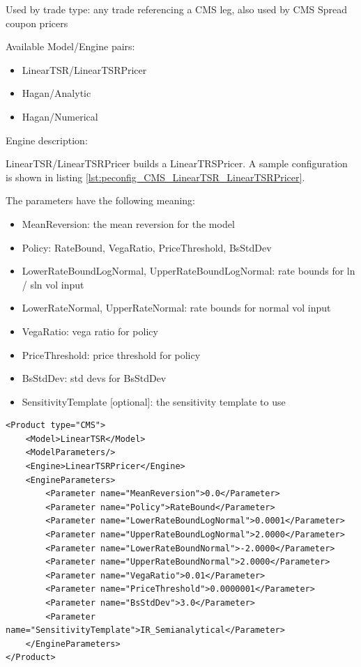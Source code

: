 Used by trade type: any trade referencing a CMS leg, also used by CMS Spread coupon pricers

Available Model/Engine pairs:

\begin{itemize}
  \item LinearTSR/LinearTSRPricer
  \item Hagan/Analytic
  \item Hagan/Numerical
\end{itemize}

Engine description:

LinearTSR/LinearTSRPricer builds a LinearTRSPricer. A sample configuration is shown in listing
\ref{lst:peconfig_CMS_LinearTSR_LinearTSRPricer}.

The parameters have the following meaning:

\begin{itemize}
\item MeanReversion: the mean reversion for the model
\item Policy: RateBound, VegaRatio, PriceThreshold, BsStdDev
\item LowerRateBoundLogNormal, UpperRateBoundLogNormal: rate bounds for ln / sln vol input
\item LowerRateNormal, UpperRateNormal: rate bounds for normal vol input
\item VegaRatio: vega ratio for policy
\item PriceThreshold: price threshold for policy
\item BsStdDev: std devs for BsStdDev
\item SensitivityTemplate [optional]: the sensitivity template to use
\end{itemize}

\begin{longlisting}
\begin{verbatim}
<Product type="CMS">
    <Model>LinearTSR</Model>
    <ModelParameters/>
    <Engine>LinearTSRPricer</Engine>
    <EngineParameters>
        <Parameter name="MeanReversion">0.0</Parameter>
        <Parameter name="Policy">RateBound</Parameter>
        <Parameter name="LowerRateBoundLogNormal">0.0001</Parameter>
        <Parameter name="UpperRateBoundLogNormal">2.0000</Parameter>
        <Parameter name="LowerRateBoundNormal">-2.0000</Parameter>
        <Parameter name="UpperRateBoundNormal">2.0000</Parameter>
        <Parameter name="VegaRatio">0.01</Parameter>
        <Parameter name="PriceThreshold">0.0000001</Parameter>
        <Parameter name="BsStdDev">3.0</Parameter>
        <Parameter name="SensitivityTemplate">IR_Semianalytical</Parameter>
    </EngineParameters>
</Product>
\end{verbatim}
\caption{Configuration for Product CMS, Model LinearTSR, Engine LinearTSRPricer}
\label{lst:peconfig_CMS_LinearTSR_LinearTSRPricer}
\end{longlisting}

